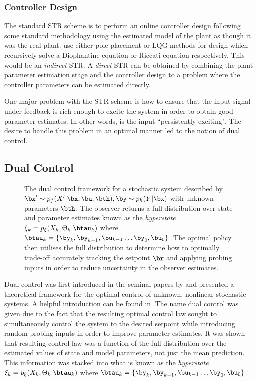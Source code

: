 \subsubsection{Controller Design}
The standard STR scheme is to perform an online controller design following some standard methodology using the estimated model of the plant as though it was the real plant. \cite{AsWi94} use either pole-placement or LQG methods for design which recursively solve a Diophantine equation or Riccati equation respectively. This would be an \textit{indirect} STR. A \textit{direct} STR can be obtained by combining the plant parameter estimation stage and the controller design to a problem where the controller parameters can be estimated directly.

One major problem with the STR scheme is how to ensure that the input signal under feedback is rich enough to excite the system in order to obtain good parameter estimates. In other words, is the input ``persistently exciting". The desire to handle this problem in an optimal manner led to the notion of dual control.


\subsection{Dual Control}
\begin{figure}
\centering

\caption{The dual control framework for a stochastic system described by $\bx' \sim p_f(X'|\bx,\bu;\bth), \by \sim p_h(Y|\bx)$ with unknown parameters $\bth$. The observer returns a full distribution over state and parameter estimates known as the \textit{hyperstate} $\xi_k = p_{\xi}(X_k,\Theta_k|\btau_{k})$ where $\btau_{k} = \{\by_k,\by_{k-1}, \bu_{k-1} \dots \by_0, \bu_0\}$. The optimal policy then utilises the full distribution to determine how to optimally trade-off accurately tracking the setpoint $\br$ and applying probing inputs in order to reduce uncertainty in the observer estimates.}
\label{figs:duCO}
\end{figure}

Dual control was first introduced in the seminal papers by \cite{Fel61} and presented a theoretical framework for the optimal control of unknown, nonlinear stochastic systems. A helpful introduction can be found in \cite{Wit00}.The name dual control was given due to the fact that the resulting optimal control law sought to simultaneously control the system to the desired setpoint while introducing random probing inputs in order to improve parameter estimates. It was shown that resulting control law was a function of the full distribution over the estimated values of state and model parameters, not just the mean prediction. This information was stacked into what is known as the \textit{hyperstate} $\xi_k = p_{\xi}(X_k,\Theta_k|\btau_{k})$ where $\btau_{k} = \{\by_k,\by_{k-1}, \bu_{k-1} \dots \by_0, \bu_0\}$.

